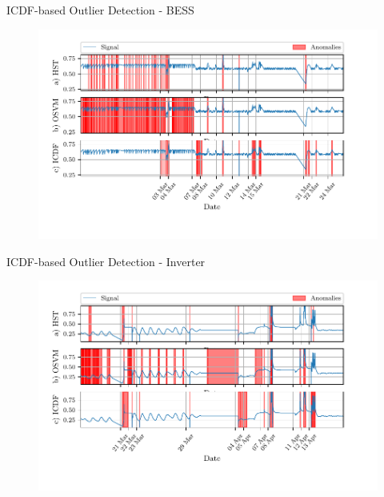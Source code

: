 \documentclass{beamer}
\begin{document}
\begin{frame}{ICDF-based Outlier Detection - BESS}
    \begin{figure}[htpb]
        \begin{center}
            \includegraphics[width=\linewidth]{figures/Average_Cell_Temperature_sliding_compare_anomalies.pdf}
        \end{center}
    \end{figure}
\end{frame}

\begin{frame}{ICDF-based Outlier Detection - Inverter}
    \begin{figure}[htpb]
        \begin{center}
            \includegraphics[width=\linewidth]{figures/Inverter_Temperature_sliding_compare_anomalies.pdf}
        \end{center}
    \end{figure}
\end{frame}
\end{document}

